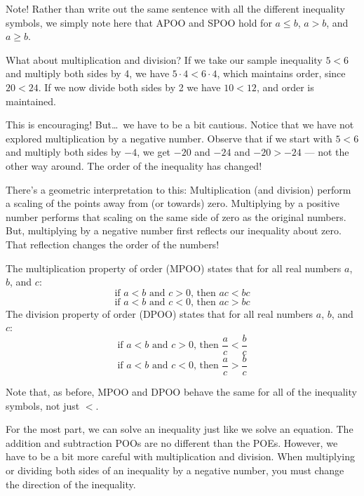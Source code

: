 Note! Rather than write out the same sentence with all the different inequality symbols, we simply note here that APOO and SPOO hold for $a \leq b$, $a>b$, and $a \geq b$. 

What about multiplication and division? If we take our sample inequality $5<6$ and multiply both sides by 4, we have $5\cdot4 < 6\cdot4$, which maintains order, since $20 < 24$. If we now divide both sides by 2 we have $10<12$, and order is maintained.

This is encouraging! But\ldots\ we have to be a bit cautious. Notice that we have not explored multiplication by a negative number. Observe that if we start with $5<6$ and multiply both sides by $-4$, we get $-20$ and $-24$ and $-20 > -24$ --- not the other way around. The order of the inequality has changed!


There's a geometric interpretation to this: Multiplication (and division) perform a scaling of the points away from (or towards) zero. Multiplying by a positive number performs that scaling on the same side of zero as the original numbers. But, multiplying by a negative number first reflects our inequality about zero. That reflection changes the order of the numbers!

\begin{boxeddef2col}
The \gls{multiplication property of order} (MPOO) states that for all real numbers $a$, $b$, and $c$:
\[\text{if } a < b \text{ and } c > 0 \text{, then } ac < bc\]
\[\text{if } a < b \text{ and } c < 0 \text{, then } ac > bc\]
\tcblower
The \gls{division property of order} (DPOO) states that for all real numbers $a$, $b$, and $c$:
\[\text{if } a < b \text{ and } c > 0 \text{, then } \frac{a}{c} < \frac{b}{c}\]
\[\text{if } a < b \text{ and } c < 0 \text{, then } \frac{a}{c} > \frac{b}{c}\]
\end{boxeddef2col}

Note that, as before, MPOO and DPOO behave the same for all of the inequality symbols, not just $<$.

For the most part, we can solve an inequality just like we solve an equation. The addition and subtraction POOs are no different than the POEs. However, we have to be a bit more careful with multiplication and division. When multiplying or dividing both sides of an inequality by a negative number, you must change the direction of the inequality.

